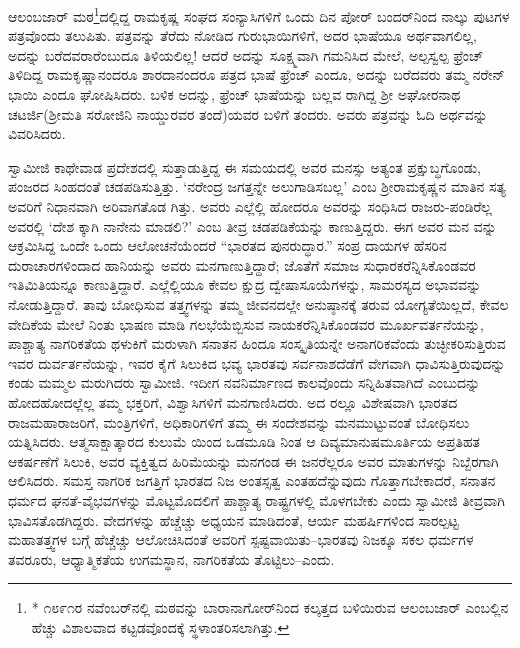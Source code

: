 ಆಲಂಬಜಾರ್ ಮಠ\footnote{* ೧೮೯೧ರ ನವೆಂಬರ್​ನಲ್ಲಿ ಮಠವನ್ನು ಬಾರಾನಾಗೋರ್​ನಿಂದ ಕಲ್ಕತ್ತದ ಬಳಿಯಿರುವ ಆಲಂಬಜಾರ್ ಎಂಬಲ್ಲಿನ ಹೆಚ್ಚು ವಿಶಾಲವಾದ ಕಟ್ಟಡವೊಂದಕ್ಕೆ ಸ್ಥಳಾಂತರಿಸಲಾಗಿತ್ತು.}ದಲ್ಲಿದ್ದ ರಾಮಕೃಷ್ಣ ಸಂಘದ ಸಂನ್ಯಾಸಿಗಳಿಗೆ ಒಂದು ದಿನ ಪೋರ್ ಬಂದರ್​ನಿಂದ ನಾಲ್ಕು ಪುಟಗಳ ಪತ್ರವೊಂದು ತಲುಪಿತು. ಪತ್ರವನ್ನು ತೆರೆದು ನೋಡಿದ ಗುರುಭಾಯಿಗಳಿಗೆ, ಅದರ ಭಾಷೆಯೂ ಅರ್ಥವಾಗಲಿಲ್ಲ, ಅದನ್ನು ಬರೆದವರಾರೆಂಬುದೂ ತಿಳಿಯಲಿಲ್ಲ! ಆದರೆ ಅದನ್ನು ಸೂಕ್ಷ್ಮವಾಗಿ ಗಮನಿಸಿದ ಮೇಲೆ, ಅಲ್ಪಸ್ವಲ್ಪ ಫ್ರೆಂಚ್ ತಿಳಿದಿದ್ದ ರಾಮಕೃಷ್ಣಾನಂದರೂ ಶಾರದಾನಂದರೂ ಪತ್ರದ ಭಾಷೆ ಫ್ರೆಂಚ್ ಎಂದೂ, ಅದನ್ನು ಬರೆದವರು ತಮ್ಮ ನರೇನ್​ಭಾಯಿ ಎಂದೂ ಘೋಷಿಸಿದರು. ಬಳಿಕ ಅದನ್ನು, ಫ್ರೆಂಚ್ ಭಾಷೆಯನ್ನು ಬಲ್ಲವ ರಾಗಿದ್ದ ಶ್ರೀ ಅಘೋರನಾಥ ಚಟರ್ಜಿ(ಶ್ರೀಮತಿ ಸರೋಜಿನಿ ನಾಯ್ಡುರವರ ತಂದೆ)ಯವರ ಬಳಿಗೆ ತಂದರು. ಅವರು ಪತ್ರವನ್ನು ಓದಿ ಅರ್ಥವನ್ನು ವಿವರಿಸಿದರು.

ಸ್ವಾಮೀಜಿ ಕಾಥೇವಾಡ ಪ್ರದೇಶದಲ್ಲಿ ಸುತ್ತಾಡುತ್ತಿದ್ದ ಈ ಸಮಯದಲ್ಲಿ ಅವರ ಮನಸ್ಸು ಅತ್ಯಂತ ಪ್ರಕ್ಷುಬ್ಧಗೊಂಡು, ಪಂಜರದ ಸಿಂಹದಂತೆ ಚಡಪಡಿಸುತ್ತಿತ್ತು. ‘ನರೇಂದ್ರ ಜಗತ್ತನ್ನೇ ಅಲುಗಾಡಿಸಬಲ್ಲ’ ಎಂಬ ಶ್ರೀರಾಮಕೃಷ್ಣನ ಮಾತಿನ ಸತ್ಯ ಅವರಿಗೆ ನಿಧಾನವಾಗಿ ಅರಿವಾಗತೊಡ ಗಿತ್ತು. ಅವರು ಎಲ್ಲೆಲ್ಲಿ ಹೋದರೂ ಅವರನ್ನು ಸಂಧಿಸಿದ ರಾಜರು-ಪಂಡಿರೆಲ್ಲ ಅವರಲ್ಲಿ ‘ದೇಶ ಕ್ಕಾಗಿ ನಾನೇನು ಮಾಡಲಿ?’ ಎಂಬ ತೀವ್ರ ಚಡಪಡಿಕೆಯನ್ನು ಕಾಣುತ್ತಿದ್ದರು. ಈಗ ಅವರ ಮನ ವನ್ನು ಆಕ್ರಮಿಸಿದ್ದ ಒಂದೇ ಒಂದು ಆಲೋಚನೆಯೆಂದರೆ “ಭಾರತದ ಪುನರುದ್ಧಾರ.” ಸಂಪ್ರ ದಾಯಗಳ ಹೆಸರಿನ ದುರಾಚಾರಗಳಿಂದಾದ ಹಾನಿಯನ್ನು ಅವರು ಮನಗಾಣುತ್ತಿದ್ದಾರೆ; ಜೊತೆಗೆ ಸಮಾಜ ಸುಧಾರಕರೆನ್ನಿಸಿಕೊಂಡವರ ಇತಿಮಿತಿಯನ್ನೂ ಕಾಣುತ್ತಿದ್ದಾರೆ. ಎಲ್ಲೆಲ್ಲಿಯೂ ಕೇವಲ ಕ್ಷುದ್ರ ದ್ವೇಷಾಸೂಯೆಗಳನ್ನು, ಸಾಮರಸ್ಯದ ಅಭಾವವನ್ನು ನೋಡುತ್ತಿದ್ದಾರೆ. ತಾವು ಬೋಧಿಸುವ ತತ್ತ್ವಗಳನ್ನು ತಮ್ಮ ಜೀವನದಲ್ಲೇ ಅನುಷ್ಠಾನಕ್ಕೆ ತರುವ ಯೋಗ್ಯತೆಯಿಲ್ಲದೆ, ಕೇವಲ ವೇದಿಕೆಯ ಮೇಲೆ ನಿಂತು ಭಾಷಣ ಮಾಡಿ ಗಲಭೆಯೆಬ್ಬಿಸುವ ನಾಯಕರೆನ್ನಿಸಿಕೊಂಡವರ ಮೂರ್ಖವರ್ತನೆಯನ್ನು, ಪಾಶ್ಚಾತ್ಯ ನಾಗರಿಕತೆಯ ಥಳುಕಿಗೆ ಮರುಳಾಗಿ ಸನಾತನ ಹಿಂದೂ ಸಂಸ್ಕೃತಿಯನ್ನೇ ಅನಾಗರಿಕವೆಂದು ತುಚ್ಛೀಕರಿಸುತ್ತಿರುವ ಇವರ ದುರ್ವರ್ತನೆಯನ್ನು, ಇವರ ಕೈಗೆ ಸಿಲುಕಿದ ಭವ್ಯ ಭಾರತವು ಸರ್ವನಾಶದೆಡೆಗೆ ವೇಗವಾಗಿ ಧಾವಿಸುತ್ತಿರುವುದನ್ನು ಕಂಡು ಮಮ್ಮಲ ಮರುಗಿದರು ಸ್ವಾಮೀಜಿ. ಇದೀಗ ನವನಿರ್ಮಾಣದ ಕಾಲವೊಂದು ಸನ್ನಿಹಿತವಾಗಿದೆ ಎಂಬುದನ್ನು ಹೋದಹೋದಲ್ಲೆಲ್ಲ ತಮ್ಮ ಭಕ್ತರಿಗೆ, ವಿಶ್ವಾಸಿಗಳಿಗೆ ಮನಗಾಣಿಸಿದರು. ಅದ ರಲ್ಲೂ ವಿಶೇಷವಾಗಿ ಭಾರತದ ರಾಜಮಹಾರಾಜರಿಗೆ, ಮಂತ್ರಿಗಳಿಗೆ, ಅಧಿಕಾರಿಗಳಿಗೆ ತಮ್ಮ ಈ ಸಂದೇಶವನ್ನು ಮನಮುಟ್ಟುವಂತೆ ಬೋಧಿಸಲು ಯತ್ನಿಸಿದರು. ಆತ್ಮಸಾಕ್ಷಾತ್ಕಾರದ ಕುಲುಮೆ ಯಿಂದ ಒಡಮೂಡಿ ನಿಂತ ಆ ದಿವ್ಯಮಾನುಷಮೂರ್ತಿಯ ಅಪ್ರತಿಹತ ಆಕರ್ಷಣೆಗೆ ಸಿಲುಕಿ, ಅವರ ವ್ಯಕ್ತಿತ್ವದ ಹಿರಿಮೆಯನ್ನು ಮನಗಂಡ ಈ ಜನರೆಲ್ಲರೂ ಅವರ ಮಾತುಗಳನ್ನು ನಿಬ್ಬೆರಗಾಗಿ ಆಲಿಸಿದರು. ಸಮಸ್ತ ನಾಗರಿಕ ಜಗತ್ತಿಗೆ ಭಾರತದ ನಿಜ ಅಂತಸ್ಸತ್ವ ಎಂತಹದೆನ್ನುವುದು ಗೊತ್ತಾಗಬೇಕಾದರೆ, ಸನಾತನ ಧರ್ಮದ ಘನತೆ-ವೈಭವಗಳನ್ನು ಮೊಟ್ಟಮೊದಲಿಗೆ ಪಾಶ್ಚಾತ್ಯ ರಾಷ್ಟ್ರಗಳಲ್ಲಿ ಮೊಳಗಬೇಕು ಎಂದು ಸ್ವಾಮೀಜಿ ತೀವ್ರವಾಗಿ ಭಾವಿಸತೊಡಗಿದ್ದರು. ವೇದಗಳನ್ನು ಹೆಚ್ಚೆಚ್ಚು ಅಧ್ಯಯನ ಮಾಡಿದಂತೆ, ಆರ್ಯ ಮಹರ್ಷಿಗಳಿಂದ ಸಾರಲ್ಪಟ್ಟ ಮಹಾತತ್ತ್ವಗಳ ಬಗ್ಗೆ ಹೆಚ್ಚೆಚ್ಚು ಆಲೋಚಿಸಿದಂತೆ ಅವರಿಗೆ ಸ್ಪಷ್ಟವಾಯಿತು–ಭಾರತವು ನಿಜಕ್ಕೂ ಸಕಲ ಧರ್ಮಗಳ ತವರೂರು, ಆಧ್ಯಾತ್ಮಿಕತೆಯ ಉಗಮಸ್ಥಾನ, ನಾಗರಿಕತೆಯ ತೊಟ್ಟಿಲು–ಎಂದು.

